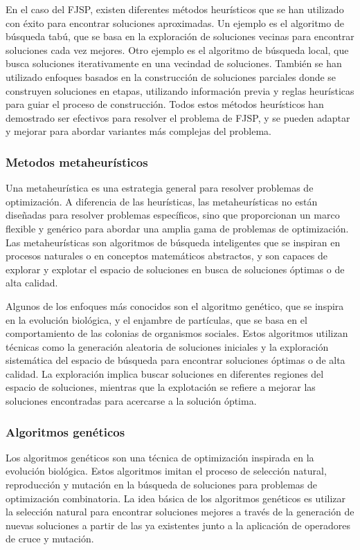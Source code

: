En el caso del FJSP, existen diferentes métodos heurísticos que se han
utilizado con éxito para encontrar soluciones aproximadas. Un ejemplo es el
algoritmo de búsqueda tabú\cite{Howell_2023}, que se basa en la exploración de
soluciones vecinas para encontrar soluciones cada vez mejores. Otro ejemplo es
el algoritmo de búsqueda local, que busca soluciones iterativamente en una
vecindad de soluciones. También se han utilizado enfoques basados en la
construcción de soluciones parciales donde se construyen soluciones en etapas,
utilizando información previa y reglas heurísticas para guiar el proceso de
construcción. Todos estos métodos heurísticos han demostrado ser efectivos para
resolver el problema de FJSP, y se pueden adaptar y mejorar para abordar
variantes más complejas del problema.

\subsubsection{Metodos metaheurísticos}
Una metaheurística\cite{Metaheuristic_2023} es una estrategia general para
resolver problemas de optimización. A diferencia de las heurísticas, las
metaheurísticas no están diseñadas para resolver problemas específicos, sino
que proporcionan un marco flexible y genérico para abordar una amplia gama de
problemas de optimización. Las metaheurísticas son algoritmos de búsqueda
inteligentes que se inspiran en procesos naturales o en conceptos matemáticos
abstractos, y son capaces de explorar y explotar el espacio de soluciones en
busca de soluciones óptimas o de alta calidad.\medskip

Algunos de los enfoques más conocidos son el algoritmo genético, que se inspira
en la evolución biológica, y el enjambre de partículas, que se basa en el
comportamiento de las colonias de organismos sociales. Estos algoritmos
utilizan técnicas como la generación aleatoria de soluciones iniciales y la
exploración sistemática del espacio de búsqueda para encontrar soluciones
óptimas o de alta calidad. La exploración implica buscar soluciones en
diferentes regiones del espacio de soluciones, mientras que la explotación se
refiere a mejorar las soluciones encontradas para acercarse a la solución
óptima.

\subsubsection{Algoritmos genéticos}
Los algoritmos genéticos\cite{GeneticAlgorithm_2023} son una técnica de
optimización inspirada en la evolución biológica. Estos algoritmos imitan el
proceso de selección natural, reproducción y mutación en la búsqueda de
soluciones para problemas de optimización combinatoria. La idea básica de los
algoritmos genéticos es utilizar la selección natural para encontrar soluciones
mejores a través de la generación de nuevas soluciones a partir de las ya
existentes junto a la aplicación de operadores de cruce y mutación.\medskip

